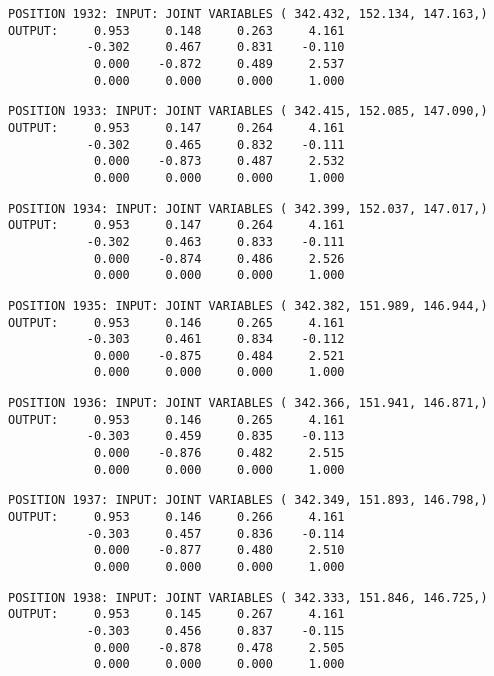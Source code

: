 \begin{verbatim}
POSITION 1932: INPUT: JOINT VARIABLES ( 342.432, 152.134, 147.163,)
OUTPUT:     0.953     0.148     0.263     4.161
           -0.302     0.467     0.831    -0.110
            0.000    -0.872     0.489     2.537
            0.000     0.000     0.000     1.000
\end{verbatim} \pagebreak[1]\begin{verbatim}
POSITION 1933: INPUT: JOINT VARIABLES ( 342.415, 152.085, 147.090,)
OUTPUT:     0.953     0.147     0.264     4.161
           -0.302     0.465     0.832    -0.111
            0.000    -0.873     0.487     2.532
            0.000     0.000     0.000     1.000
\end{verbatim} \pagebreak[1]\begin{verbatim}
POSITION 1934: INPUT: JOINT VARIABLES ( 342.399, 152.037, 147.017,)
OUTPUT:     0.953     0.147     0.264     4.161
           -0.302     0.463     0.833    -0.111
            0.000    -0.874     0.486     2.526
            0.000     0.000     0.000     1.000
\end{verbatim} \pagebreak[1]\begin{verbatim}
POSITION 1935: INPUT: JOINT VARIABLES ( 342.382, 151.989, 146.944,)
OUTPUT:     0.953     0.146     0.265     4.161
           -0.303     0.461     0.834    -0.112
            0.000    -0.875     0.484     2.521
            0.000     0.000     0.000     1.000
\end{verbatim} \pagebreak[1]\begin{verbatim}
POSITION 1936: INPUT: JOINT VARIABLES ( 342.366, 151.941, 146.871,)
OUTPUT:     0.953     0.146     0.265     4.161
           -0.303     0.459     0.835    -0.113
            0.000    -0.876     0.482     2.515
            0.000     0.000     0.000     1.000
\end{verbatim} \pagebreak[1]\begin{verbatim}
POSITION 1937: INPUT: JOINT VARIABLES ( 342.349, 151.893, 146.798,)
OUTPUT:     0.953     0.146     0.266     4.161
           -0.303     0.457     0.836    -0.114
            0.000    -0.877     0.480     2.510
            0.000     0.000     0.000     1.000
\end{verbatim} \pagebreak[1]\begin{verbatim}
POSITION 1938: INPUT: JOINT VARIABLES ( 342.333, 151.846, 146.725,)
OUTPUT:     0.953     0.145     0.267     4.161
           -0.303     0.456     0.837    -0.115
            0.000    -0.878     0.478     2.505
            0.000     0.000     0.000     1.000
\end{verbatim} \pagebreak[1]\begin{verbatim}

\end{verbatim}
